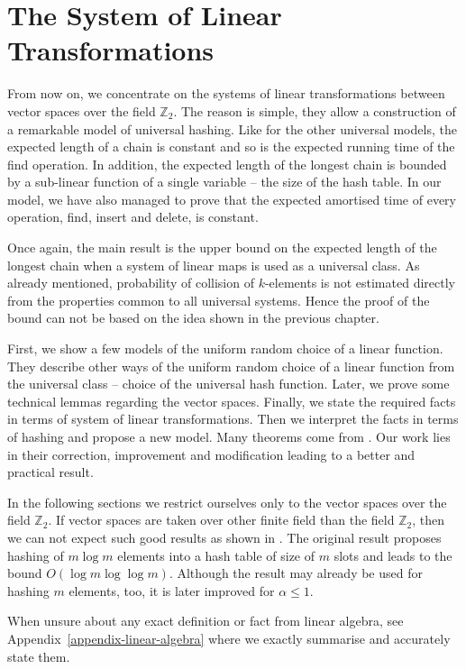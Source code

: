 \chapter{The System of Linear Transformations}
\label{chapter-linear-systems}
From now on, we concentrate on the systems of linear transformations between vector spaces over the field $\mathbb{Z}_2$. The reason is simple, they allow a construction of a remarkable model of universal hashing. Like for the other universal models, the expected length of a chain is constant and so is the expected running time of the find operation. In addition, the expected length of the longest chain is bounded by a sub-linear function of a single variable -- the size of the hash table. In our model, we have also managed to prove that the expected amortised time of every operation, find, insert and delete, is constant.

Once again, the main result is the upper bound on the expected length of the longest chain when a system of linear maps is used as a universal class. As already mentioned, probability of collision of $k$-elements is not estimated directly from the properties common to all universal systems. Hence the proof of the bound can not be based on the idea shown in the previous chapter.

First, we show a few models of the uniform random choice of a linear function. They describe other ways of the uniform random choice of a linear function from the universal class -- choice of the universal hash function. Later, we prove some technical lemmas regarding the vector spaces. Finally, we state the required facts in terms of system of linear transformations. Then we interpret the facts in terms of hashing and propose a new model. Many theorems come from \cite{DBLP:journals/jacm/AlonDMPT99}. Our work lies in their correction, improvement and modification leading to a better and practical result.

In the following sections we restrict ourselves only to the vector spaces over the field $\mathbb{Z}_2$. If vector spaces are taken over other finite field than the field $\mathbb{Z}_2$, then we can not expect such good results as shown in \cite{DBLP:journals/jacm/AlonDMPT99}. The original result proposes hashing of $m \log m$ elements into a hash table of size of $m$ slots and leads to the bound $O(\log m \log \log m)$. Although the result may already be used for hashing $m$ elements, too, it is later improved for $\alpha \leq 1$.

When unsure about any exact definition or fact from linear algebra, see Appendix~\ref{appendix-linear-algebra} where we exactly summarise and accurately state them.






